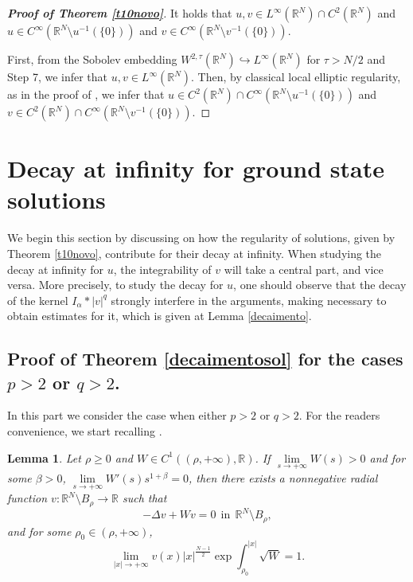 \documentclass[12pt,a4paper]{article}
\newtheorem{lemma}[theorem]{Lemma}
\numberwithin{equation}{section}
\begin{document}
\begin{proof}[\bf{Proof of Theorem \ref{t10novo}}]
\medbreak
{} It holds that $u, v\in L^{\infty}(\mathbb{R}^N) \cap C^2(\mathbb{R}^N)$ and $u \in C^{\infty}(\mathbb{R}^N \setminus u^{-1}(\{0\}))$ and $v \in C^{\infty}(\mathbb{R}^N \setminus v^{-1}(\{0\}))$.

First, from the Sobolev embedding $W^{2,\tau}(\mathbb{R}^N) \hookrightarrow L^{\infty}(\mathbb{R}^N)$ for $\tau> N/2$ and Step 7, we infer that $u,v \in L^{\infty}(\mathbb{R}^N)$. Then, by classical local elliptic regularity, as in the proof of \cite[Proposition 4.1]{Moroz2013}, we infer that $u \in C^2(\mathbb{R}^N)\cap C^{\infty}(\mathbb{R}^N \setminus u^{-1}(\{0\}))$ and $v \in C^2(\mathbb{R}^N)\cap C^{\infty}(\mathbb{R}^N \setminus v^{-1}(\{0\}))$.
\end{proof}

\section{Decay at infinity for ground state solutions}\label{sec-decay}



We begin this section by discussing on how the regularity of solutions, given by Theorem \ref{t10novo}, contribute for their decay at infinity. When studying the decay at infinity for $u$, the integrability of $v$ will take a central part, and vice versa. More precisely, to study the decay for $u$, one should observe that the decay of the kernel $I_\alpha \ast |v|^q$  strongly interfere in the arguments, making necessary to obtain estimates for it, which is given at Lemma \ref{decaimento}. 



\subsection{Proof of Theorem \ref{decaimentosol} for the cases $p>2$ or $q>2$.}\label{duasquad}

In this part we consider the case when either $p>2$ or $q>2$. For the readers convenience, we start recalling \cite[Lemma 6.4]{Moroz2013}. 

\begin{lemma}\label{lpm2}
Let $\rho \geq 0$ and $W\in C^1((\rho, +\infty), \mathbb{R})$. If $\lim\limits_{s\rightarrow +\infty}W(s) > 0$ and for some $\beta>0$, $\lim\limits_{s\rightarrow + \infty}W'(s)s^{1+\beta} = 0$,
then there exists a nonnegative radial function $v:\mathbb{R}^N \setminus B_\rho \rightarrow \mathbb{R}$ such that
$$
-\Delta v + W v = 0 \ \ \text{in} \ \ \mathbb{R}^N \setminus B_\rho,
$$
and for some $\rho_0 \in (\rho, +\infty)$,
$$
\lim\limits_{|x|\rightarrow + \infty} v(x) |x|^{\frac{N-1}{2}}\exp \int_{\rho_0}^{|x|}\sqrt{W} = 1.
$$
\end{lemma}
\end{document}
